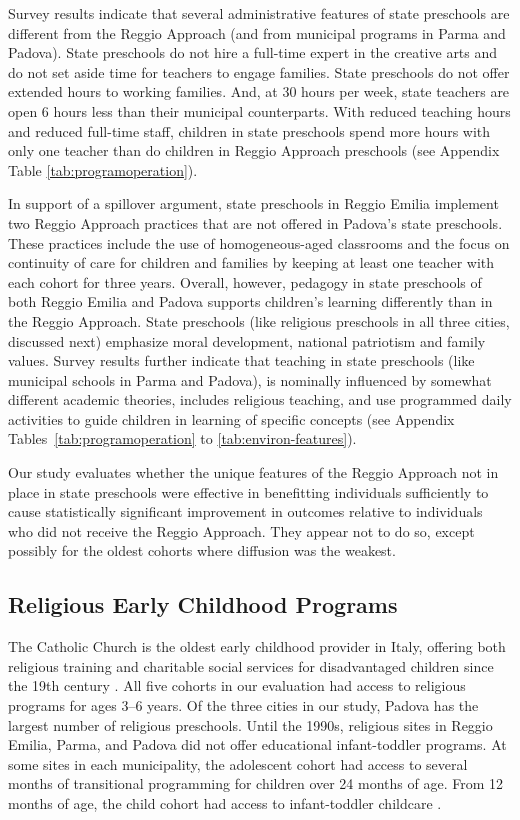 Survey results indicate that several administrative features of state preschools are different from the Reggio Approach (and from municipal programs in Parma and Padova). State preschools do not hire a full-time expert in the creative arts and do not set aside time for teachers to engage families. State preschools do not offer extended hours to working families. And, at 30 hours per week, state teachers are open 6 hours less than their municipal counterparts. With reduced teaching hours and reduced full-time staff, children in state preschools spend more hours with only one teacher than do children in Reggio Approach preschools (see Appendix Table \ref{tab:programoperation}).

In support of a spillover argument, state preschools in Reggio Emilia implement two Reggio Approach practices that are not offered in Padova's state preschools. These practices include the use of homogeneous-aged classrooms and the focus on continuity of care for children and families by keeping at least one teacher with each cohort for three years. Overall, however, pedagogy in state preschools of both Reggio Emilia and Padova  supports children's learning differently than in the Reggio Approach. State preschools (like religious preschools in all three cities, discussed next) emphasize moral development, national patriotism and family values. Survey results further indicate that teaching in state preschools (like municipal schools in Parma and Padova), is nominally influenced by somewhat different academic theories, includes religious teaching, and use programmed daily activities to guide children in learning of specific concepts (see Appendix Tables~\ref{tab:programoperation} to \ref{tab:environ-features}).

Our study evaluates whether the unique features of the Reggio Approach not in place in state preschools were effective in benefitting individuals sufficiently to cause statistically significant improvement in outcomes relative to individuals who did not receive the Reggio Approach. They appear not to do so, except possibly for the oldest cohorts where diffusion was the weakest.

\subsection{Religious Early Childhood Programs}

The Catholic Church is the oldest early childhood provider in Italy, offering both religious training and charitable social services for disadvantaged children since the 19th century \citep{OECD_2001_Italy-Country-Note}. All five cohorts in our evaluation had access to religious programs for ages 3--6 years. Of the three cities in our study, Padova has the largest number of religious preschools. Until the 1990s, religious sites in Reggio Emilia, Parma, and Padova did not offer educational infant-toddler programs. At some sites in each municipality, the adolescent cohort had access to several months of transitional programming for children over 24 months of age. From 12 months of age, the child cohort had access to infant-toddler childcare \citep{Malizia-Cicatelli_2011_BOOK_Catholic-School,CEHD_2016_Historical-Analysis}.

